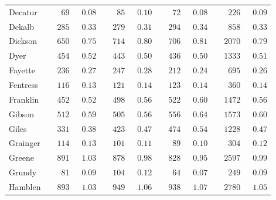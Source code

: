 \documentclass[9pt, oneside]{article}   	%
\begin{document}
\begin{longtable}{lcccccccc}
Decatur  & $\phantom{000}69$ & $\phantom{0}0.08$ & $\phantom{000}85$ & $\phantom{0}0.10$ & $\phantom{000}72$ & $\phantom{0}0.08$ & $\phantom{000}226$ & $\phantom{0}0.09$ \\
Dekalb  & $\phantom{00}285$ & $\phantom{0}0.33$ & $\phantom{00}279$ & $\phantom{0}0.31$ & $\phantom{00}294$ & $\phantom{0}0.34$ & $\phantom{000}858$ & $\phantom{0}0.33$ \\
Dickson  & $\phantom{00}650$ & $\phantom{0}0.75$ & $\phantom{00}714$ & $\phantom{0}0.80$ & $\phantom{00}706$ & $\phantom{0}0.81$ & $\phantom{00}2070$ & $\phantom{0}0.79$ \\
Dyer  & $\phantom{00}454$ & $\phantom{0}0.52$ & $\phantom{00}443$ & $\phantom{0}0.50$ & $\phantom{00}436$ & $\phantom{0}0.50$ & $\phantom{00}1333$ & $\phantom{0}0.51$ \\
Fayette  & $\phantom{00}236$ & $\phantom{0}0.27$ & $\phantom{00}247$ & $\phantom{0}0.28$ & $\phantom{00}212$ & $\phantom{0}0.24$ & $\phantom{000}695$ & $\phantom{0}0.26$ \\
Fentress  & $\phantom{00}116$ & $\phantom{0}0.13$ & $\phantom{00}121$ & $\phantom{0}0.14$ & $\phantom{00}123$ & $\phantom{0}0.14$ & $\phantom{000}360$ & $\phantom{0}0.14$ \\
Franklin  & $\phantom{00}452$ & $\phantom{0}0.52$ & $\phantom{00}498$ & $\phantom{0}0.56$ & $\phantom{00}522$ & $\phantom{0}0.60$ & $\phantom{00}1472$ & $\phantom{0}0.56$ \\
Gibson  & $\phantom{00}512$ & $\phantom{0}0.59$ & $\phantom{00}505$ & $\phantom{0}0.56$ & $\phantom{00}556$ & $\phantom{0}0.64$ & $\phantom{00}1573$ & $\phantom{0}0.60$ \\
Giles  & $\phantom{00}331$ & $\phantom{0}0.38$ & $\phantom{00}423$ & $\phantom{0}0.47$ & $\phantom{00}474$ & $\phantom{0}0.54$ & $\phantom{00}1228$ & $\phantom{0}0.47$ \\
Grainger  & $\phantom{00}114$ & $\phantom{0}0.13$ & $\phantom{00}101$ & $\phantom{0}0.11$ & $\phantom{000}89$ & $\phantom{0}0.10$ & $\phantom{000}304$ & $\phantom{0}0.12$ \\
Greene  & $\phantom{00}891$ & $\phantom{0}1.03$ & $\phantom{00}878$ & $\phantom{0}0.98$ & $\phantom{00}828$ & $\phantom{0}0.95$ & $\phantom{00}2597$ & $\phantom{0}0.99$ \\
Grundy  & $\phantom{000}81$ & $\phantom{0}0.09$ & $\phantom{00}104$ & $\phantom{0}0.12$ & $\phantom{000}64$ & $\phantom{0}0.07$ & $\phantom{000}249$ & $\phantom{0}0.09$ \\
Hamblen  & $\phantom{00}893$ & $\phantom{0}1.03$ & $\phantom{00}949$ & $\phantom{0}1.06$ & $\phantom{00}938$ & $\phantom{0}1.07$ & $\phantom{00}2780$ & $\phantom{0}1.05$ \\

\end{longtable}
\end{document}
